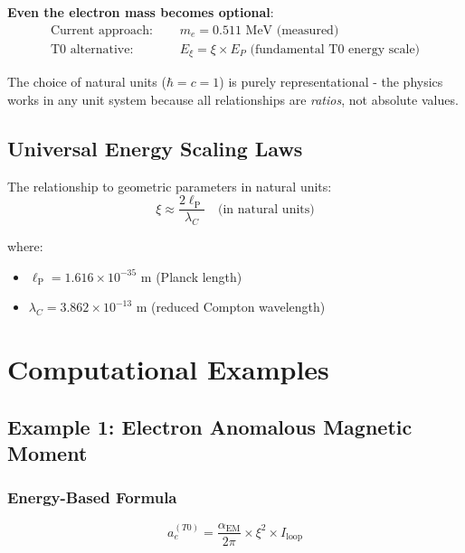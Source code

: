 \documentclass[12pt,a4paper]{article}
\newcommand{\alphaEM}{\alpha_{\text{EM}}}
\newcommand{\lP}{\ell_{\text{P}}}
\newcommand{\xipar}{\xi}
\begin{document}
\textbf{Even the electron mass becomes optional}:
\begin{align}
	\text{Current approach: } &\quad m_e = 0.511 \text{ MeV (measured)} \\
	\text{T0 alternative: } &\quad E_\xi = \xi \times E_P \text{ (fundamental T0 energy scale)}
\end{align}

The choice of natural units ($\hbar = c = 1$) is purely representational - the physics works in any unit system because all relationships are \textit{ratios}, not absolute values.	
	\subsection{Universal Energy Scaling Laws}
	\label{subsec:universal_scaling_laws}
	
	The relationship to geometric parameters in natural units:
	\begin{equation}
		\xipar \approx \frac{2\lP}{\lambda_C} \quad \text{(in natural units)}
		\label{eq:universal_energy_scaling}
	\end{equation}
	
	where:
	\begin{itemize}
		\item $\lP = 1.616 \times 10^{-35}$ m (Planck length)
		\item $\lambda_C = 3.862 \times 10^{-13}$ m (reduced Compton wavelength)
	\end{itemize}
	
	
	\section{Computational Examples}
	\label{sec:computational_examples}
	
	\subsection{Example 1: Electron Anomalous Magnetic Moment}
	\label{subsec:electron_g2_energy}
	
	\subsubsection{Energy-Based Formula}
	\begin{equation}
		a_e^{(T0)} = \frac{\alphaEM}{2\pi} \times \xipar^2 \times I_{\text{loop}}
		\label{eq:electron_g2_energy_formula}
	\end{equation}
	
\end{document}
